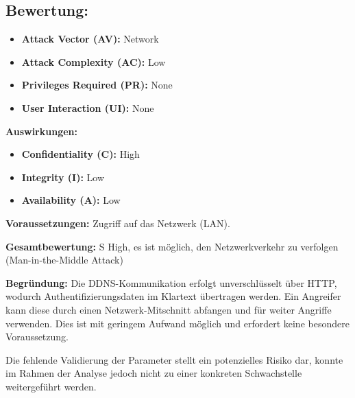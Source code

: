 	\subsection{Bewertung:}
	\label{sec:Bewertung-DDNS}

	\begin{itemize}
		\item \textbf{Attack Vector (AV):} Network
		\item \textbf{Attack Complexity (AC):} Low
		\item \textbf{Privileges Required (PR):} None
		\item \textbf{User Interaction (UI):} None
	\end{itemize}

	\textbf{Auswirkungen:}
	\begin{itemize}
		\item \textbf{Confidentiality (C):} High
		\item \textbf{Integrity (I):} Low
		\item \textbf{Availability (A):} Low
	\end{itemize}

	\textbf{Voraussetzungen:}  
	Zugriff auf das Netzwerk (LAN).

	\textbf{Gesamtbewertung:}  S
	High, es ist möglich, den Netzwerkverkehr zu verfolgen (Man-in-the-Middle Attack)

	\textbf{Begründung:}  
	Die DDNS-Kommunikation erfolgt unverschlüsselt über HTTP, wodurch Authentifizierungsdaten
	im Klartext übertragen werden. Ein Angreifer kann diese durch einen Netzwerk-Mitschnitt
	abfangen und für weiter Angriffe verwenden.
	Dies ist mit geringem Aufwand möglich und erfordert keine besondere Voraussetzung.

	Die fehlende Validierung der Parameter stellt ein potenzielles Risiko dar, konnte im Rahmen
	der Analyse jedoch nicht zu einer konkreten Schwachstelle weitergeführt werden.

	
